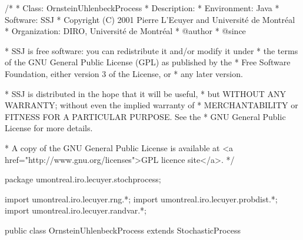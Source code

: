 \begin{code}
\begin{hide}
/*
 * Class:        OrnsteinUhlenbeckProcess
 * Description:  
 * Environment:  Java
 * Software:     SSJ 
 * Copyright (C) 2001  Pierre L'Ecuyer and Université de Montréal
 * Organization: DIRO, Université de Montréal
 * @author       
 * @since

 * SSJ is free software: you can redistribute it and/or modify it under
 * the terms of the GNU General Public License (GPL) as published by the
 * Free Software Foundation, either version 3 of the License, or
 * any later version.

 * SSJ is distributed in the hope that it will be useful,
 * but WITHOUT ANY WARRANTY; without even the implied warranty of
 * MERCHANTABILITY or FITNESS FOR A PARTICULAR PURPOSE.  See the
 * GNU General Public License for more details.

 * A copy of the GNU General Public License is available at
   <a href="http://www.gnu.org/licenses">GPL licence site</a>.
 */
\end{hide}
package umontreal.iro.lecuyer.stochprocess;\begin{hide}
import umontreal.iro.lecuyer.rng.*;
import umontreal.iro.lecuyer.probdist.*;
import umontreal.iro.lecuyer.randvar.*;

\end{hide}

public class OrnsteinUhlenbeckProcess extends StochasticProcess \begin{hide} {
    protected NormalGen    gen;
    protected double       alpha,
                           beta,
                           sigma;
    // Precomputed values 
    protected double[]     badt,
                           alphadt,
                           sigmasqrdt;
\end{hide}
\end{code}
